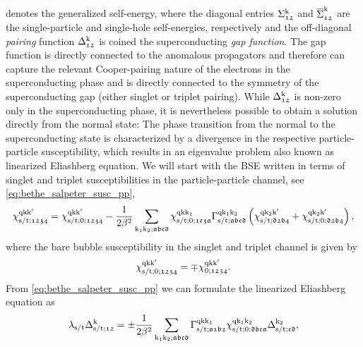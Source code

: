 \documentclass[../../main.tex]{subfiles}
\begin{document}
denotes the generalized self-energy, where the diagonal entries $\Sigma_{\mathfrak{12}}^{\text{k}}$ and $\overline{\Sigma}_{\mathfrak{12}}^{\text{k}}$ are the single-particle and single-hole self-energies, respectively and the off-diagonal \textit{pairing} function $\Delta_{\mathfrak{12}}^{\text{k}}$ is coined the superconducting \textit{gap function}. The gap function is directly connected to the anomalous propagators and therefore can capture the relevant Cooper-pairing nature of the electrons in the superconducting phase and is directly connected to the symmetry of the superconducting gap (either singlet or triplet pairing). While $\Delta_{\mathfrak{12}}^{\text{k}}$ is non-zero only in the superconducting phase, it is nevertheless possible to obtain a solution directly from the normal state: The phase transition from the normal to the superconducting state is characterized by a divergence in the respective particle-particle susceptibility, which results in an eigenvalue problem also known as linearized Eliashberg equation. We will start with the BSE written in terms of singlet and triplet susceptibilities in the particle-particle channel, see \eqref{eq:bethe_salpeter_susc_pp},
\begin{align}
\chi^{\text{q}\text{k}\text{k}'}_{\text{s}/\text{t};\mathfrak{1234}}=\chi^{\text{q}\text{k}\text{k}'}_{\text{s}/\text{t};0;\mathfrak{1234}}-\frac{1}{2\beta^2}\sum_{\text{k}_1\text{k}_2;\mathfrak{abcd}}\chi^{\text{q}\text{k}\text{k}_1}_{\text{s}/\text{t};0;\mathfrak{1c3a}}\Gamma^{\text{q}\text{k}_1\text{k}_2}_{\text{s}/\text{t};\mathfrak{abcd}}\left (\chi^{\text{q}\text{k}_2\text{k}'}_{\text{s}/\text{t};\mathfrak{d2b4}}+\chi^{\text{q}\text{k}_2\text{k}'}_{\text{s}/\text{t};0;\mathfrak{d2b4}}\right ),
\end{align}
where the bare bubble susceptibility in the singlet and triplet channel is given by
\begin{align}
	\chi^{\text{q}\text{k}\text{k}'}_{\text{s}/\text{t};0;\mathfrak{1234}}=\mp\chi^{\text{q}\text{k}\text{k}'}_{0;\mathfrak{1234}}.
\end{align}
From \eqref{eq:bethe_salpeter_susc_pp} we can formulate the linearized Eliashberg equation as
\begin{align}\label{eq:linearized_eliashberg}
	\lambda_{\text{s}/\text{t}}\Delta_{\text{s}/\text{t};\mathfrak{12}}^{\text{k}}=\pm\frac{1}{2\beta^2}\sum_{\text{k}_1\text{k}_2;\mathfrak{abcd}}\Gamma^{\text{q}\text{k}\text{k}_1}_{\text{s}/\text{t};\mathfrak{a1b2}}\chi^{\text{q}\text{k}_1\text{k}_2}_{\text{s}/\text{t};0;\mathfrak{dbca}}\Delta_{\text{s}/\text{t};\mathfrak{cd}}^{\text{k}_2},
\end{align}
\end{document}
